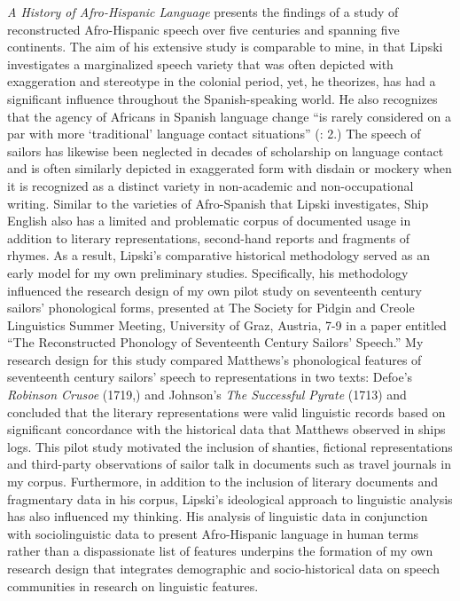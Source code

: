  \textit{A History of Afro-Hispanic Language} presents the findings of a study of reconstructed Afro-Hispanic speech over five centuries and spanning five continents. The aim of his extensive study is comparable to mine, in that Lipski investigates a marginalized speech variety that was often depicted with exaggeration and stereotype in the colonial period, yet, he theorizes, has had a significant influence throughout the Spanish-speaking world. He also recognizes that the agency of Africans in Spanish language change “is rarely considered on a par with more ‘traditional’ language contact situations” (\citealt{Lipski2005}: 2.) The speech of sailors has likewise been neglected in decades of scholarship on language contact and is often similarly depicted in exaggerated form with disdain or mockery when it is recognized as a distinct variety in non-academic and non-occupational writing. Similar to the varieties of Afro-Spanish that Lipski investigates, Ship English also has a limited and problematic corpus of documented usage in addition to literary representations, second-hand reports and fragments of rhymes. As a result, Lipski’s comparative historical methodology served as an early model for my own preliminary studies. Specifically, his methodology influenced the research design of my own pilot study on seventeenth century sailors’ phonological forms, presented at The Society for Pidgin and Creole Linguistics Summer Meeting, University of Graz, Austria, 7-9 \citealt{July2015} in a paper entitled “The Reconstructed Phonology of Seventeenth Century Sailors’ Speech.” My research design for this study compared Matthews’s phonological features of seventeenth century sailors’ speech to representations in two texts: Defoe’s \textit{Robinson Crusoe} (1719,) and Johnson’s \textit{The Successful Pyrate} (1713) and concluded that the literary representations were valid linguistic records based on significant concordance with the historical data that Matthews observed in ships logs. This pilot study motivated the inclusion of shanties, fictional representations and third-party observations of sailor talk in documents such as travel journals in my corpus. Furthermore, in addition to the inclusion of literary documents and fragmentary data in his corpus, Lipski’s ideological approach to linguistic analysis has also influenced my thinking. His analysis of linguistic data in conjunction with sociolinguistic data to present Afro-Hispanic language in human terms rather than a dispassionate list of features underpins the formation of my own research design that integrates demographic and socio-historical data on speech communities in research on linguistic features.

